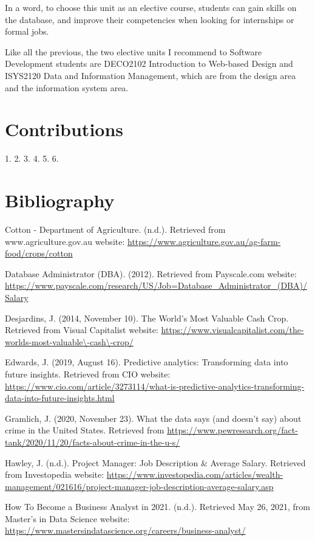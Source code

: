 \documentclass[12pt]{article}
\begin{document}
In a word, to choose this unit as an elective course, students can gain skills on the database, and improve their competencies when looking for internships or formal jobs.

Like all the previous, the two elective units I recommend to Software Development students are DECO2102 Introduction to Web-based Design and ISYS2120 Data and Information Management, which are from the design area and the information system area.


\newpage
\section{Contributions}
1.
2.
3.
4.
5.
6.


\newpage

\section{Bibliography}

Cotton - Department of Agriculture. (n.d.). Retrieved from www.agriculture.gov.au website:
\url{https://www.agriculture.gov.au/ag-farm-food/crops/cotton}

Database Administrator (DBA). (2012). Retrieved from Payscale.com website:
\url{https://www.payscale.com/research/US/Job=Database\_Administrator\_(DBA)/Salary}

Desjardins, J. (2014, November 10). The World’s Most Valuable Cash Crop. Retrieved from Visual Capitalist website:
\url{https://www.visualcapitalist.com/the-worlds-most-valuable\-cash\-crop/}

Edwards, J. (2019, August 16). Predictive analytics: Transforming data into future insights. Retrieved from CIO website:
\url{https://www.cio.com/article/3273114/what-is-predictive-analytics-transforming-data-into-future-insights.html}

Gramlich, J. (2020, November 23). What the data says (and doesn't say) about crime in the United States. Retrieved from \url{https://www.pewresearch.org/fact-tank/2020/11/20/facts-about-crime-in-the-u-s/}

Hawley, J. (n.d.). Project Manager: Job Description \& Average Salary. Retrieved from Investopedia website:
\url{https://www.investopedia.com/articles/wealth-management/021616/project-manager-job-description-average-salary.asp}

How To Become a Business Analyst in 2021. (n.d.). Retrieved May 26, 2021, from Master’s in Data Science website:
\url{https://www.mastersindatascience.org/careers/business-analyst/}
\end{document}
